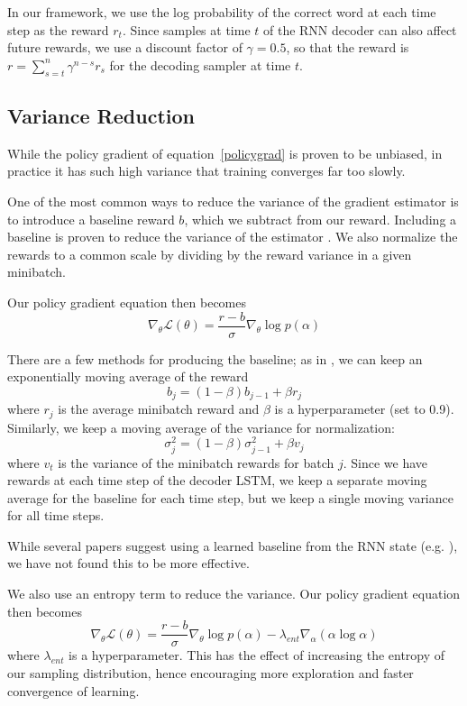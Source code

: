 \documentclass[11pt]{report}
\begin{document}
In our framework, we use the log probability of the correct word at each time step as the reward $r_t$. Since samples at time $t$ of the RNN decoder can also affect future rewards, we use a discount factor of $\gamma = 0.5$, so that the reward is $r = \sum_{s = t}^n \gamma^{n-s}r_s$ for the decoding sampler at time $t$.

\subsection{Variance Reduction}

While the policy gradient of equation~\ref{policygrad} is proven to be unbiased, in practice it has such high variance that training converges far too slowly.

One of the most common ways to reduce the variance of the gradient estimator is to introduce a baseline reward $b$, which we subtract from our reward. Including a baseline is proven to reduce the variance of the estimator \citep{mnih2014belief}. We also normalize the rewards to a common scale by dividing by the reward variance in a given minibatch.


Our policy gradient equation then becomes
\begin{equation}
\label{policygradbaseline}
\nabla_\theta \mathcal{L}(\theta) = \frac{r-b}{\sigma} \nabla_\theta \log p(\alpha)
\end{equation}

There are a few methods for producing the baseline; as in \cite{mnih2014belief}, we can keep an exponentially moving average of the reward
$$b_j = (1 - \beta) b_{j-1} + \beta r_j$$
where $r_j$ is the average minibatch reward and $\beta$ is a hyperparameter (set to 0.9).
Similarly, we keep a moving average of the variance for normalization:
$$\sigma^2_j = (1 - \beta) \sigma^2_{j-1} + \beta v_j$$
where $v_t$ is the variance of the minibatch rewards for batch $j$. Since we have rewards at each time step of the decoder LSTM, we keep a separate moving average for the baseline for each time step, but we keep a single moving variance for all time steps.

While several papers suggest using a learned baseline from the RNN state (e.g. \cite{ranzato2015}), we have not found this to be more effective.

We also use an entropy term to reduce the variance. Our policy gradient equation then becomes
\begin{equation}
\label{policygradbaselineentropy}
\nabla_\theta \mathcal{L}(\theta) = \frac{r-b}{\sigma} \nabla_\theta \log p(\alpha) - \lambda_{ent} \nabla_\alpha(\alpha \log \alpha)
\end{equation}
where $\lambda_{ent}$ is a hyperparameter. This has the effect of increasing the entropy of our sampling distribution, hence encouraging more exploration and faster convergence of learning.
\end{document}
